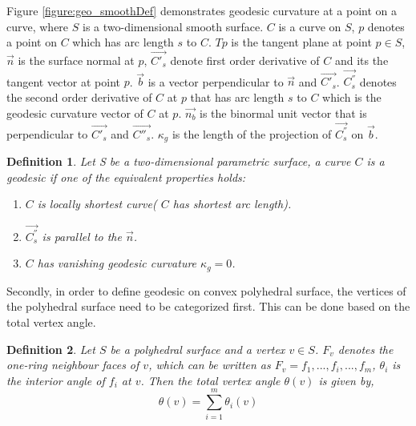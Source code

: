 Figure \ref{figure:geo_smoothDef} demonstrates geodesic curvature at a point on a curve, where $S$ is a two-dimensional smooth surface. $C$ is a curve on $S$, $p$ denotes a point on $C$ which has arc length $s$ to $C$. $T{p}$ is the tangent plane at point $p\in{S}$, $\vec{n}$ is the surface normal at $p$, $\vec{C'_{s}}$ denote first order derivative of $C$ and its the tangent vector at point $p$. $\vec{b}$ is a vector perpendicular to $\vec{n}$ and $\vec{C'_{s}}$. $\vec{C^{''}_{s}}$ denotes the second order derivative of $C$ at $p$ that has arc length $s$ to $C$ which is the geodesic curvature vector of $C$ at $p$. $\vec{n_{b}}$ is the binormal unit vector that is perpendicular to $\vec{C'_{s}}$ and $\vec{C''_{s}}$. $\kappa_{g}$ is the length of the projection of $\vec{C^{''}_{s}}$ on $\vec{b}$.


\newtheorem{geodesic_def}{Definition}
\begin{geodesic_def}
 Let S be a two-dimensional parametric surface, a curve $C$ is a geodesic if one of the equivalent properties holds:
\begin{enumerate}
	\item $C$ is locally shortest curve( $C$ has shortest arc length).
	\item $\vec{C^{''}_{s}}$ is parallel to the $\vec{n}$.
	\item $C$ has vanishing geodesic curvature $\kappa_{g} = 0$. 
\end{enumerate}
\label{def:geodesic_def_smooth}
\end{geodesic_def}

Secondly, in order to define geodesic on convex polyhedral surface, the vertices of the polyhedral surface need to be categorized first. This can be done based on the total vertex angle.

\begin{geodesic_def}
 Let $S$ be a polyhedral surface and a vertex $v \in S$. $F_{v}$ denotes the one-ring neighbour faces of $v$, which can be written as $F_{v} = {f_{1},..., f_{i},..., f_{m}}$, $\theta_{i}$ is the interior angle of $f_{i}$ at $v$. Then the total vertex angle $\theta(v)$ is given by,
  \begin{displaymath}
	\theta(v) =\sum_{i=1}^{m}\theta_{i}(v)
  \end{displaymath}
\label{def:total_vertex_angle}
\end{geodesic_def}


